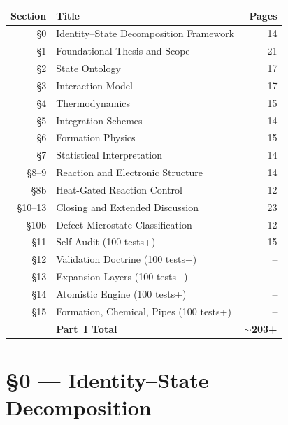 \documentclass[11pt, letterpaper, oneside]{report}
\begin{document}
\vspace{1cm}
\begin{center}
\renewcommand{\arraystretch}{1.3}
\begin{tabular}{rlr}
\toprule
\textbf{Section} & \textbf{Title} & \textbf{Pages} \\
\midrule
\S0  & Identity--State Decomposition Framework   & 14 \\
\S1  & Foundational Thesis and Scope             & 21 \\
\S2  & State Ontology                            & 17 \\
\S3  & Interaction Model                         & 17 \\
\S4  & Thermodynamics                            & 15 \\
\S5  & Integration Schemes                       & 14 \\
\S6  & Formation Physics                         & 15 \\
\S7  & Statistical Interpretation                & 14 \\
\S8--9 & Reaction and Electronic Structure        & 14 \\
\S8b & Heat-Gated Reaction Control               & 12 \\
\S10--13 & Closing and Extended Discussion        & 23 \\
\S10b & Defect Microstate Classification          & 12 \\
\S11 & Self-Audit (100 tests+)                   & 15 \\
\S12 & Validation Doctrine (100 tests+)          & -- \\
\S13 & Expansion Layers (100 tests+)             & -- \\
\S14 & Atomistic Engine (100 tests+)             & -- \\
\S15 & Formation, Chemical, Pipes (100 tests+)   & -- \\
\midrule
     & \textbf{Part~I Total}                     & \textbf{$\sim$203+} \\
\bottomrule
\end{tabular}
\end{center}

\chapter{\S0 --- Identity--State Decomposition}
\label{ch:s0}

\end{document}
